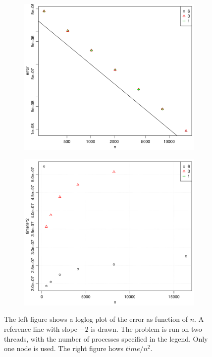 \documentclass[norsk]{article} %
\numberwithin{equation}{section} %
\numberwithin{figure}{section} %
\numberwithin{table}{section} %
\begin{document}
%
\begin{figure}[h!]
  \centering
  \begin{subfigure}[b]{0.48\textwidth}
    \includegraphics[width=\textwidth]{./Figures/errVsn.pdf}
  \end{subfigure}%
  \quad
  \begin{subfigure}[b]{0.48\textwidth}
    \includegraphics[width=\textwidth]{./Figures/timeOverN2Vsn.pdf}
  \end{subfigure}
  \vspace{1\baselineskip}
  \caption{The left figure shows a loglog plot of the error as function of $n$. A reference line with slope $-2$ is drawn. The problem is run on two threads, with the number of processes specified in the legend. Only one node is used. The right figure hows $time/n^2$.}
  \label{fig:conv}
\end{figure}
\end{document}
